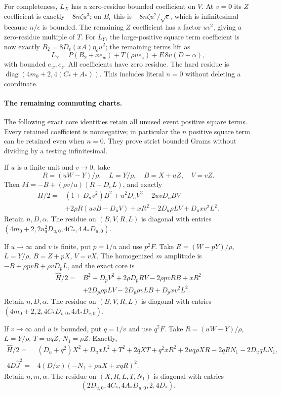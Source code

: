 For completeness, $L_X$ has a zero-residue bounded coefficient on
$V$.  At $v=0$ its $Z$ coefficient is exactly $-8n\zeta u^3$;
on $B_\epsilon$ this is $-8n\zeta u^2/\sqrt\epsilon$, which is
infinitesimal because $n/\epsilon$ is bounded.  The remaining
$Z$ coefficient has a factor $uv^2$, giving a zero-residue multiple
of $T$.  For $L_Y$, the large-positive square term coefficient is now exactly
$B_2=8D_v(xA)\eta_cu^2$; the remaining terms lift as
\[
 L_Y=P(B_2+xe_w)+T(\rho u e_z)+E\,8v(D-\alpha),
\]
with bounded $e_w,e_z$.  All coefficients have zero residue.  The
hard residue is $\operatorname{diag}(4m_0+2,4(C_*+A_*))$.
This includes literal $n=0$ without deleting a coordinate.

\paragraph{The remaining commuting charts.}
The following exact core identities retain all unused event positive square terms.
Every retained coefficient is nonnegative; in particular the $n$
positive square term can be retained even when $n=0$.  They prove strict bounded
Grams without dividing by a testing infinitesimal.

If $u$ is a finite unit and $v\to0$, take
\[
 R=(uW-Y)/\rho,\quad L=Y/\rho,\quad B=X+uZ,\quad V=vZ.
\]
Then $M=-B+(\rho v/u)(R+D_uL)$, and exactly
\begin{align*}
 H/2={}&(1+D_uv^2)B^2+u^2D_uV^2-2uvD_uBV\\
 &+2\rho R(uvB-D_uV)+xR^2-2D_u\rho LV+D_uxv^2L^2.
\end{align*}
Retain $n,D,\alpha$.  The residue on $(B,V,R,L)$ is diagonal
with entries $(4m_0+2,2u_0^2D_{u,0},4C_*,4A_*D_{u,0})$.

If $u\to\infty$ and $v$ is finite, put $p=1/u$ and use $p^2F$.
Take $R=(W-pY)/\rho$, $L=Y/\rho$, $B=Z+pX$, $V=vX$.
The homogenized $m$ amplitude is
$-B+\rho pvR+\rho vD_pL$, and the exact core is
\begin{align*}
 \widehat H/2={}&B^2+D_pV^2+2\rho D_pRV-2\rho pvRB+xR^2\\
 &+2D_p\rho pLV-2D_p\rho vLB+D_pxv^2L^2.
\end{align*}
Retain $n,D,\alpha$.  The residue on $(B,V,R,L)$ is diagonal
with entries $(4m_0+2,2,4C_*D_{v,0},4A_*D_{v,0})$.

If $v\to\infty$ and $u$ is bounded, put $q=1/v$ and use $q^2F$.
Take $R=(uW-Y)/\rho$, $L=Y/\rho$, $T=uqZ$, $N_1=\rho Z$.
Exactly,
\begin{align*}
 \widehat H/2={}&(D_u+q^2)X^2+D_uxL^2+T^2+2qXT
       +q^2xR^2+2uq\rho XR-2qRN_1-2D_uqLN_1,\\
 4D\widehat J^2={}&4(D/x)(-N_1+\rho uX+xqR)^2.
\end{align*}
Retain $n,m,\alpha$.  The residue on $(X,R,L,T,N_1)$ is diagonal
with entries
\[ (2D_{u,0},4C_*,4A_*D_{u,0},2,4D_*). \]

